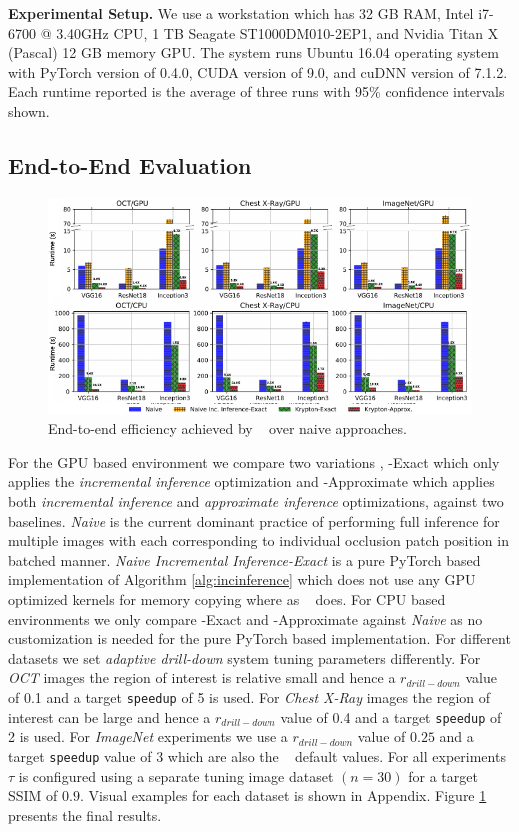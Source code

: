 \vspace{2mm}
\noindent \textbf{Experimental Setup.}
We use a workstation which has 32 GB RAM, Intel i7-6700 @ 3.40GHz CPU, 1 TB Seagate ST1000DM010-2EP1, and Nvidia Titan X (Pascal) 12 GB memory GPU.
The system runs Ubuntu 16.04 operating system with PyTorch version of 0.4.0, CUDA version of 9.0, and cuDNN version of 7.1.2.
Each runtime reported is the average of three runs with 95\% confidence intervals shown.

\subsection{End-to-End Evaluation}

\begin{figure}[t]
\includegraphics[width=\textwidth]{images/5_1_all_edited}
\caption{End-to-end efficiency achieved by \system~ over naive approaches.}
\label{fig:5_1_all_edited}
\end{figure}

For the GPU based environment we compare two variations \system, \system-Exact which only applies the \textit{incremental inference} optimization and \system-Approximate which applies both \textit{incremental inference} and \textit{approximate inference} optimizations, against two baselines.
\textit{Naive} is the current dominant practice of performing full inference for multiple images with each corresponding to individual occlusion patch position in batched manner.
\textit{Naive Incremental Inference-Exact} is a pure PyTorch based implementation of Algorithm \ref{alg:incinference} which does not use any GPU optimized kernels for memory copying where as \system~ does.
For CPU based environments we only compare \system-Exact and \system-Approximate against \textit{Naive} as no customization is needed for the pure PyTorch based implementation.
For different datasets we set \textit{adaptive drill-down} system tuning parameters differently.
For \textit{OCT} images the region of interest is relative small and hence a $r_{drill-down}$ value of 0.1 and a target \texttt{speedup} of 5 is used.
For \textit{Chest X-Ray} images the region of interest can be large and hence a $r_{drill-down}$ value of 0.4 and a target \texttt{speedup} of 2 is used.
For \textit{ImageNet} experiments we use a $r_{drill-down}$ value of $0.25$ and a target \texttt{speedup} value of 3 which are also the \system~ default values.
For all experiments $\tau$ is configured using a separate tuning image dataset $(n=30)$ for a target SSIM of $0.9$.
Visual examples for each dataset is shown in Appendix.
Figure \ref{fig:5_1_all_edited} presents the final results.

